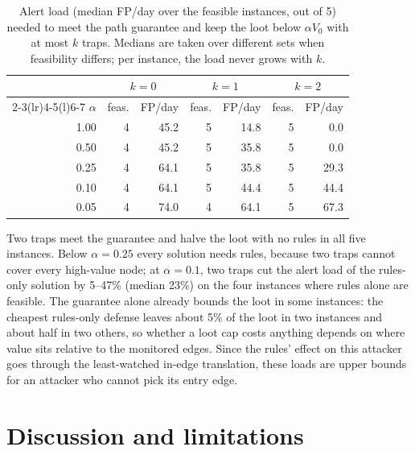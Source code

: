 \documentclass[10pt,twocolumn]{article}
\begin{document}
\begin{table}[t]
\centering\footnotesize\setlength{\tabcolsep}{4pt}
\caption{Alert load (median FP/day over the feasible instances, out of 5) needed to meet the path
guarantee and keep the loot below $\alpha V_0$ with at most $k$ traps. Medians are taken over
different sets when feasibility differs; per instance, the load never grows with $k$.}
\label{tab:joint}
\begin{tabular}{@{}rrrrrrr@{}}
\toprule
& \multicolumn{2}{c}{$k=0$} & \multicolumn{2}{c}{$k=1$} & \multicolumn{2}{c}{$k=2$}\\
\cmidrule(lr){2-3}\cmidrule(lr){4-5}\cmidrule(l){6-7}
$\alpha$ & feas. & FP/day & feas. & FP/day & feas. & FP/day \\
\midrule
1.00 & 4 & 45.2 & 5 & 14.8 & 5 & 0.0 \\
0.50 & 4 & 45.2 & 5 & 35.8 & 5 & 0.0 \\
0.25 & 4 & 64.1 & 5 & 35.8 & 5 & 29.3 \\
0.10 & 4 & 64.1 & 5 & 44.4 & 5 & 44.4 \\
0.05 & 4 & 74.0 & 4 & 64.1 & 5 & 67.3 \\
\bottomrule
\end{tabular}
\end{table}

Two traps meet the guarantee and halve the loot with no rules in all five instances. Below
$\alpha=0.25$ every solution needs rules, because two traps cannot cover every high-value node;
at $\alpha=0.1$, two traps cut the alert load of the rules-only solution by 5--47\% (median 23\%)
on the four instances where rules alone are feasible. The guarantee alone already bounds the loot
in some instances: the cheapest rules-only defense leaves about 5\% of the loot in two instances and
about half in two others, so whether a loot cap costs anything depends on where value sits relative
to the monitored edges. Since the rules' effect on this attacker goes through the least-watched
in-edge translation, these loads are upper bounds for an attacker who cannot pick its entry edge.

\section{Discussion and limitations}\label{sec:limits}
\end{document}
